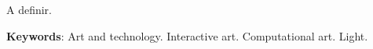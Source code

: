 
\begin{ABSTRACT}
	\begin{SingleSpace}
	
		\hspace{-1.3 cm}A definir.

		\vspace*{0.5cm}\hspace{-1.3 cm}\textbf{Keywords}: Art and technology. Interactive art. Computational art. Light.
		
		
	\end{SingleSpace}

\end{ABSTRACT}

